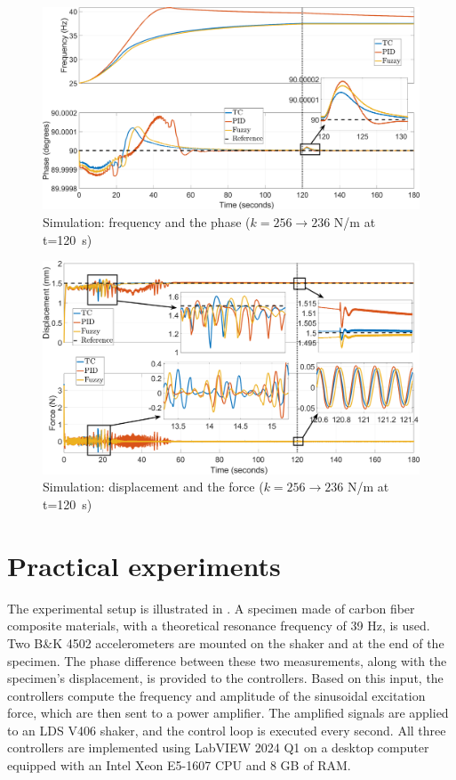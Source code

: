 \documentclass[lettersize,journal]{IEEEtran}
\begin{document}
\begin{figure}
    \centering    \includegraphics[width=\linewidth]{F_frequency_sim.png}
    \caption{Simulation: frequency and the phase ($k=256 \rightarrow 236$ N/m at t=120~s)}
    \label{F_sim_frequency}
\end{figure}

\begin{figure}
    \centering    \includegraphics[width=\linewidth]{F_displacement_sim.png}
    \caption{Simulation: displacement and the force ($k=256 \rightarrow 236$ N/m at t=120~s)}
    \label{F_sim_displacement}
\end{figure}



\section{Practical experiments} \label{S_experiments}

The experimental setup is illustrated in . A specimen made of carbon fiber composite materials, with a theoretical resonance frequency of 39 Hz, is used. Two {\selectfont B\&K 4502} accelerometers are mounted on the shaker and at the end of the specimen. The phase difference between these two measurements, along with the specimen's displacement, is provided to the controllers. Based on this input, the controllers compute the frequency and amplitude of the sinusoidal excitation force, which are then sent to a power amplifier. The amplified signals are applied to an {\selectfont LDS V406} shaker, and the control loop is executed every second. All three controllers are implemented using {\selectfont LabVIEW 2024 Q1} on a desktop computer equipped with an Intel Xeon E5-1607 CPU and 8 GB of RAM.
\end{document}
